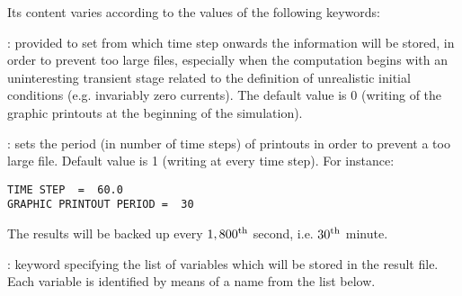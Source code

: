 Its content varies according to the values of the following keywords:

: provided to set from
which time step onwards the information will be stored, in order to prevent too
large files, especially when the computation begins with an uninteresting
transient stage related to the definition of unrealistic initial conditions
(e.g. invariably zero currents). The default value is 0 (writing of the graphic
printouts at the beginning of the simulation).

: sets the period (in number of time steps) of
printouts in order to prevent a too large file.  Default value is 1 (writing at
every time step). For instance:

\begin{lstlisting}[language=TelemacCas]
TIME STEP  =  60.0
GRAPHIC PRINTOUT PERIOD =  30
\end{lstlisting}

The results will be backed up every ${1,800}^{\rm{th}}$ second, i.e.
${30}^{\rm{th}}$ minute.

: keyword specifying the list of
variables which will be stored in the result file. Each variable is identified
by means of a name from the list below.

